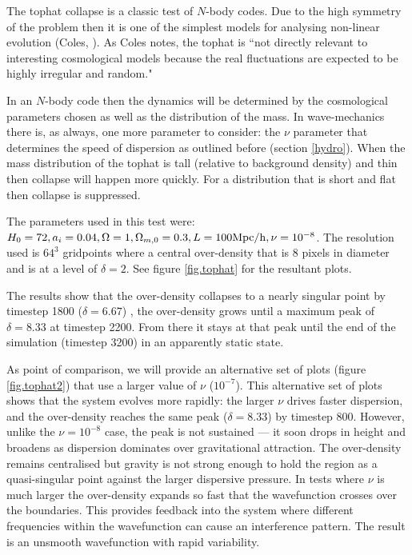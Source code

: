 The tophat collapse is a classic test of $N$-body codes. Due to the high symmetry of the problem then it is one of the simplest models for analysing non-linear evolution (Coles, \citep{bib_pcoles}). As Coles notes, the tophat is ``not directly relevant to interesting cosmological models because the real fluctuations are expected to be highly irregular and random."

In an $N$-body code then the dynamics will be determined by the cosmological parameters chosen as well as the distribution of the mass. In wave-mechanics there is, as always, one more parameter to consider: the $\nu$ parameter that determines the speed of dispersion as outlined before (section \ref{hydro}). When the mass distribution of the tophat is tall (relative to background density) and thin then collapse will happen more quickly. For a distribution that is short and flat then collapse is suppressed.

The parameters used in this test were: $H_0 = 72, a_i = 0.04, \Omega = 1, \Omega_{m,0} = 0.3, L = 100 {\rm Mpc/h}, \nu = 10^{-8}$. The resolution used is $64^3$ gridpoints where a central over-density that is 8 pixels in diameter and is at a level of $\delta = 2$. See figure \ref{fig.tophat} for the resultant plots.

The results show that the over-density collapses to a nearly singular point by timestep 1800 ($\delta = 6.67$) , the over-density grows until a maximum peak of $\delta = 8.33 $ at timestep 2200. From there it stays at that peak until the end of the simulation (timestep 3200) in an apparently static state.

As point of comparison, we will provide an alternative set of plots (figure \ref{fig.tophat2}) that use a larger value of $\nu$ ($10^{-7}$). This alternative set of plots shows that the system evolves more rapidly: the larger $\nu$ drives faster dispersion, and the over-density reaches the same peak ($\delta = 8.33$) by timestep 800. However, unlike the $\nu = 10^{-8}$ case, the peak is not sustained — it soon drops in height and broadens as dispersion dominates over gravitational attraction. The over-density remains centralised but gravity is not strong enough to hold the region as a quasi-singular point against the larger dispersive pressure. In tests where $\nu$ is much larger the over-density expands so fast that the wavefunction crosses over the boundaries. This provides feedback into the system where different frequencies within the wavefunction can cause an interference pattern. The result is an unsmooth wavefunction with rapid variability.



